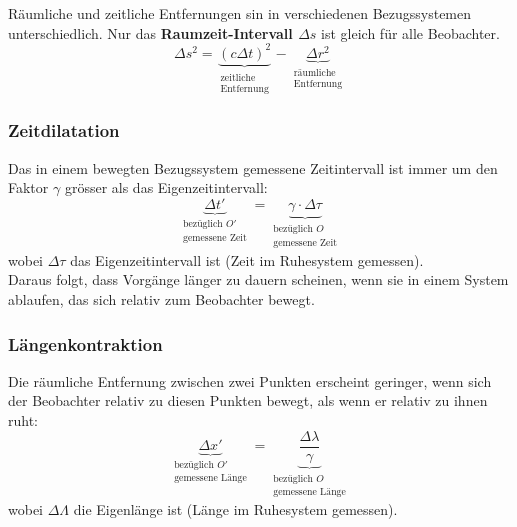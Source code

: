 \documentclass[7pt]{article}
\begin{document}
\begin{multicols*}{3}
Räumliche und zeitliche Entfernungen sin in verschiedenen Bezugssystemen unterschiedlich. Nur das \textbf{Raumzeit-Intervall $\Delta s$} ist gleich für alle Beobachter.
\begin{equation*}
	\Delta s^2 = \underbrace{(c\Delta t)^2}_{\substack{\text{zeitliche}\\ \text{Entfernung}}} - \underbrace{\Delta r^2}_{\substack{\text{räumliche}\\ \text{Entfernung}}}
\end{equation*}

\subsubsection{Zeitdilatation}

Das in einem bewegten Bezugssystem gemessene Zeitintervall ist immer um den Faktor $\gamma$ grösser als das Eigenzeitintervall:
\begin{equation*}
	\underbrace{\Delta t'}_{\substack{\text{bezüglich $O'$}\\ \text{gemessene Zeit}}}  =  \underbrace{\gamma \cdot \Delta\tau}_{\substack{\text{bezüglich $O$}\\ \text{gemessene Zeit}}}
\end{equation*}
wobei $\Delta\tau$ das Eigenzeitintervall ist (Zeit im Ruhesystem gemessen). \\

Daraus folgt, dass Vorgänge länger zu dauern scheinen, wenn sie in einem System ablaufen, das sich relativ zum Beobachter bewegt.

\subsubsection{Längenkontraktion}

Die räumliche Entfernung zwischen zwei Punkten erscheint geringer, wenn sich der Beobachter relativ zu diesen Punkten bewegt, als wenn er relativ zu ihnen ruht:
\begin{equation*}
	\underbrace{\Delta x'}_{\substack{\text{bezüglich $O'$}\\ \text{gemessene Länge}}}  =  \underbrace{\frac{\Delta\lambda}{\gamma}}_{\substack{\text{bezüglich $O$}\\ \text{gemessene Länge}}}
\end{equation*}
wobei $\Delta\Lambda$ die Eigenlänge ist (Länge im Ruhesystem gemessen).

\end{multicols*}
\end{document}
